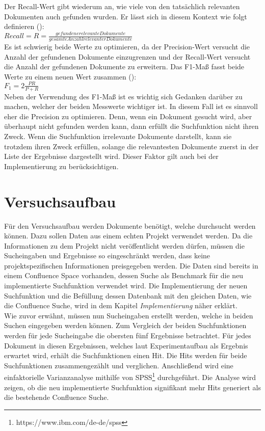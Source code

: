 Der Recall-Wert gibt wiederum an, wie viele von den tatsächlich relevanten Dokumenten auch gefunden wurden.
Er lässt sich in diesem Kontext wie folgt definieren (\cite{Sirotkin_2012}):\\

\(Recall=R=\frac{gefundene relevante Dokumente}{gesamte Anzahl relevanter Dokumente}\)\\

Es ist schwierig beide Werte zu optimieren, da der Precision-Wert versucht die Anzahl der gefundenen Dokumente einzugrenzen und der Recall-Wert versucht die Anzahl der gefundenen Dokumente zu erweitern.
Das F1-Maß fasst beide Werte zu einem neuen Wert zusammen (\cite{Sirotkin_2012}):\\

\(F_1=2\frac{PR}{P+R}\)\\

Neben der Verwendung des F1-Maß ist es wichtig sich Gedanken darüber zu machen, welcher der beiden Messwerte wichtiger ist.
In diesem Fall ist es sinnvoll eher die Precision zu optimieren.
Denn, wenn ein Dokument gesucht wird, aber überhaupt nicht gefunden werden kann, dann erfüllt die Suchfunktion nicht ihren Zweck.
Wenn die Suchfunktion irrelevante Dokumente darstellt, kann sie trotzdem ihren Zweck erfüllen, solange die relevantesten Dokumente zuerst in der Liste der Ergebnisse dargestellt wird.
Dieser Faktor gilt auch bei der Implementierung zu berücksichtigen.

\section{Versuchsaufbau}
Für den Versuchsaufbau werden Dokumente benötigt, welche durchsucht werden können.
Dazu sollen Daten aus einem echten Projekt verwendet werden.
Da die Informationen zu dem Projekt nicht veröffentlicht werden dürfen, müssen die Sucheingaben und Ergebnisse so eingeschränkt werden, dass keine projektspezifischen Informationen preisgegeben werden.
Die Daten sind bereits in einem Confluence Space vorhanden, dessen Suche als Benchmark für die neu implementierte Suchfunktion verwendet wird.
Die Implementierung der neuen Suchfunktion und die Befüllung dessen Datenbank mit den gleichen Daten, wie die Confluence Suche, wird in dem Kapitel \textit{Implementierung} näher erklärt.\\

Wie zuvor erwähnt, müssen nun Sucheingaben erstellt werden, welche in beiden Suchen eingegeben werden können.
Zum Vergleich der beiden Suchfunktionen werden für jede Sucheingabe die obersten fünf Ergebnisse betrachtet.
Für jedes Dokument in diesen Ergebnissen, welches laut Experimentaufbau als Ergebnis erwartet wird, erhält die Suchfunktionen einen Hit.
Die Hits werden für beide Suchfunktionen zusammengezählt und verglichen.
Anschließend wird eine einfaktorielle Varianzanalyse mithilfe von SPSS\footnote{https://www.ibm.com/de-de/spss} durchgeführt.
Die Analyse wird zeigen, ob die neu implementierte Suchfunktion signifikant mehr Hits generiert als die bestehende Confluence Suche.

